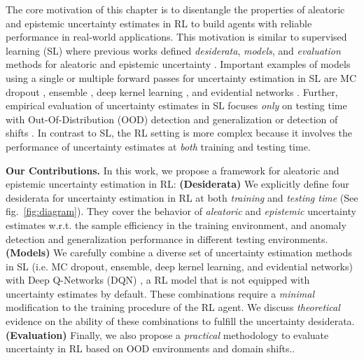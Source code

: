 The core motivation of this chapter is to disentangle the properties of aleatoric and epistemic uncertainty estimates in RL to build agents with reliable performance in real-world applications. This motivation is similar to supervised learning (SL) where previous works defined \emph{desiderata}, \emph{models}, and \emph{evaluation} methods for aleatoric and epistemic uncertainty \citep{uncertainty-deep-learning, review-uncertainty-dl, dataset-shift, robustness-uncertainty-dirichlet}. Important examples of models using a single or multiple forward passes for uncertainty estimation in SL are MC dropout \citep{dropout}, ensemble \citep{ensembles, hyper-ensembles, batch-ensembles}, deep kernel learning \citep{simple-baseline-uncertainty, due, duq, uceloss}, and evidential networks \citep{charpentier2020, PriorNetworks, natpn, evidential-regression}. Further, empirical evaluation of uncertainty estimates in SL focuses \emph{only} on testing time with Out-Of-Distribution (OOD) detection and generalization or detection of shifts \citep{dataset-shift, shifts-dataset}. In contrast to SL, the RL setting is more complex because it involves the performance of uncertainty estimates at \emph{both} training and testing time.

\textbf{Our Contributions.} In this work, we propose a framework for aleatoric and epistemic uncertainty estimation in RL: \textbf{(Desiderata)} We explicitly define four desiderata for uncertainty estimation in RL at both \emph{training} and \emph{testing time} (See fig.~\ref{fig:diagram}). They cover the behavior of \emph{aleatoric} and \emph{epistemic} uncertainty estimates w.r.t. the sample efficiency in the training environment, and anomaly detection and generalization performance in different testing environments. \textbf{(Models)} We carefully combine a diverse set of uncertainty estimation methods in SL (i.e. MC dropout, ensemble, deep kernel learning, and evidential networks) with Deep Q-Networks (DQN) \citep{dqn}, a RL model that is not equipped with uncertainty estimates by default. These combinations require a \emph{minimal} modification to the training procedure of the RL agent. We discuss \emph{theoretical} evidence on the ability of these combinations to fulfill the uncertainty desiderata. \textbf{(Evaluation)} Finally, we also propose a \emph{practical} methodology to evaluate uncertainty in RL based on OOD environments and domain shifts..
